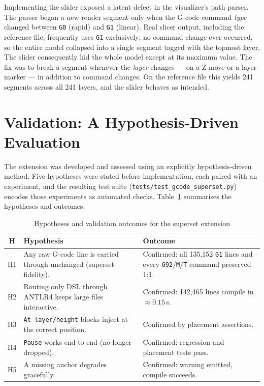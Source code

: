 Implementing the slider exposed a latent defect in the visualizer's path parser. The parser began a new render segment only when the G-code command \emph{type} changed between \texttt{G0} (rapid) and \texttt{G1} (linear). Real slicer output, including the reference file, frequently uses \texttt{G1} exclusively; no command change ever occurred, so the entire model collapsed into a single segment tagged with the topmost layer. The slider consequently hid the whole model except at its maximum value. The fix was to break a segment whenever the \emph{layer} changes --- on a Z move or a layer marker --- in addition to command changes. On the reference file this yields 241 segments across all 241 layers, and the slider behaves as intended.

\section{Validation: A Hypothesis-Driven Evaluation}
\label{sec:m3-validation}

The extension was developed and assessed using an explicitly hypothesis-driven method. Five hypotheses were stated before implementation, each paired with an experiment, and the resulting test suite (\texttt{tests/test\_gcode\_superset.py}) encodes those experiments as automated checks. Table~\ref{tab:m3-hypotheses} summarises the hypotheses and outcomes.

\begin{table}[H]
\centering
\begin{tabular}{|c|p{6.0cm}|p{4.6cm}|}
\hline
\textbf{H} & \textbf{Hypothesis} & \textbf{Outcome} \\
\hline
H1 & Any raw G-code line is carried through unchanged (superset fidelity). & Confirmed: all 135{,}152 \texttt{G1} lines and every \texttt{G92}/\texttt{M}/\texttt{T} command preserved 1:1. \\
\hline
H2 & Routing only DSL through ANTLR4 keeps large files interactive. & Confirmed: 142{,}465 lines compile in $\approx 0.15$\,s. \\
\hline
H3 & \texttt{At layer/height} blocks inject at the correct position. & Confirmed by placement assertions. \\
\hline
H4 & \texttt{Pause} works end-to-end (no longer dropped). & Confirmed: regression and placement tests pass. \\
\hline
H5 & A missing anchor degrades gracefully. & Confirmed: warning emitted, compile succeeds. \\
\hline
\end{tabular}
\caption{Hypotheses and validation outcomes for the superset extension}
\label{tab:m3-hypotheses}
\end{table}

